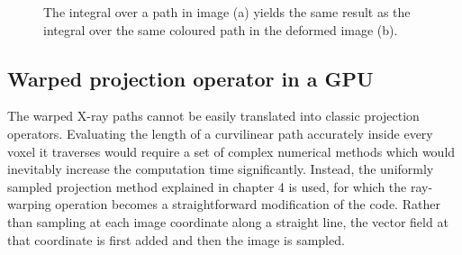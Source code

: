 \begin{figure}
\begin{center} 
\caption{\label{fig:motion} The integral over a path in image (a) yields the same result as the integral over the same coloured path in the deformed image (b).} 
\end{center} 
\end{figure}



\subsection{Warped projection operator in a GPU}

The warped X-ray paths cannot be easily translated into classic projection operators.  Evaluating the length of a curvilinear path accurately inside every voxel it traverses would require a set of complex numerical methods which would inevitably increase the computation time significantly.  Instead, the uniformly sampled projection method explained in chapter 4 is used, for which the ray-warping operation becomes a straightforward modification of the code.  Rather than sampling at each image coordinate along a straight line, the vector field at that coordinate is first added and then the image is sampled.
 
